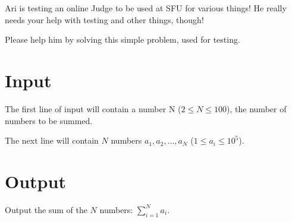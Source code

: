 \documentclass{article}
\begin{document}
Ari is testing an online Judge to be used at SFU for various things! He really needs your help with testing and other things, though!

Please help him by solving this simple problem, used for testing.

\section{Input}

The first line of input will contain a number N ($2 \leq N \leq 100$), the number of numbers to be summed.

The next line will contain $N$ numbers $a_1, a_2, \dots, a_N$ ($1 \leq a_i \leq 10^5$).

\section{Output}

Output the sum of the $N$ numbers: $\displaystyle \sum_{i=1}^N a_i$.
\end{document}

